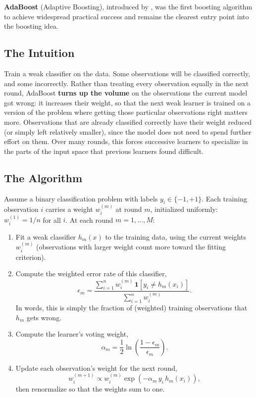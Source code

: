 \documentclass[12pt,a4paper]{article}
\begin{document}
\textbf{AdaBoost} (Adaptive Boosting), introduced by \citet{freund1997adaboost}, was the first boosting algorithm to achieve widespread practical success and remains the clearest entry point into the boosting idea.

\subsection{The Intuition}

Train a weak classifier on the data. Some observations will be classified correctly, and some incorrectly. Rather than treating every observation equally in the next round, AdaBoost \textbf{turns up the volume} on the observations the current model got wrong: it increases their weight, so that the next weak learner is trained on a version of the problem where getting those particular observations right matters more. Observations that are already classified correctly have their weight reduced (or simply left relatively smaller), since the model does not need to spend further effort on them. Over many rounds, this forces successive learners to specialize in the parts of the input space that previous learners found difficult.

\subsection{The Algorithm}

Assume a binary classification problem with labels $y_i \in \{-1, +1\}$. Each training observation $i$ carries a weight $w_i^{(m)}$ at round $m$, initialized uniformly: $w_i^{(1)} = 1/n$ for all $i$. At each round $m = 1, \ldots, M$:

\begin{enumerate}
    \item Fit a weak classifier $h_m(x)$ to the training data, using the current weights $w_i^{(m)}$ (observations with larger weight count more toward the fitting criterion).
    \item Compute the weighted error rate of this classifier,
    \begin{equation}
    \label{eq:adaboost-error}
    \epsilon_m = \frac{\sum_{i=1}^{n} w_i^{(m)} \, \mathbf{1}\!\left[y_i \neq h_m(x_i)\right]}{\sum_{i=1}^{n} w_i^{(m)}}.
    \end{equation}
    In words, this is simply the fraction of (weighted) training observations that $h_m$ gets wrong.
    \item Compute the learner's voting weight,
    \begin{equation}
    \label{eq:adaboost-alpha}
    \alpha_m = \frac{1}{2}\ln\!\left(\frac{1 - \epsilon_m}{\epsilon_m}\right).
    \end{equation}
    \item Update each observation's weight for the next round,
    \begin{equation}
    \label{eq:adaboost-update}
    w_i^{(m+1)} \propto w_i^{(m)} \exp\!\left(-\alpha_m \, y_i \, h_m(x_i)\right),
    \end{equation}
    then renormalize so that the weights sum to one.
\end{enumerate}
\end{document}
